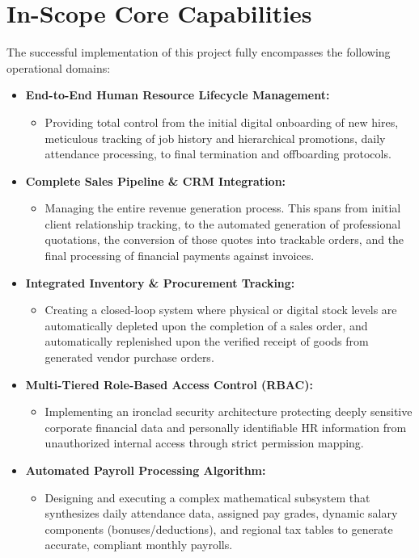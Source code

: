 ﻿\documentclass[12pt,a4paper]{report}
\begin{document}
\section*{In-Scope Core Capabilities}
The successful implementation of this project fully encompasses the following operational domains:
\begin{itemize}
    \item \textbf{End-to-End Human Resource Lifecycle Management:}
    \begin{itemize}
        \item Providing total control from the initial digital onboarding of new hires, meticulous tracking of job history and hierarchical promotions, daily attendance processing, to final termination and offboarding protocols.
    \end{itemize}
    \item \textbf{Complete Sales Pipeline \& CRM Integration:}
    \begin{itemize}
        \item Managing the entire revenue generation process. This spans from initial client relationship tracking, to the automated generation of professional quotations, the conversion of those quotes into trackable orders, and the final processing of financial payments against invoices.
    \end{itemize}
    \item \textbf{Integrated Inventory & Procurement Tracking:}
    \begin{itemize}
        \item Creating a closed-loop system where physical or digital stock levels are automatically depleted upon the completion of a sales order, and automatically replenished upon the verified receipt of goods from generated vendor purchase orders.
    \end{itemize}
    \item \textbf{Multi-Tiered Role-Based Access Control (RBAC):}
    \begin{itemize}
        \item Implementing an ironclad security architecture protecting deeply sensitive corporate financial data and personally identifiable HR information from unauthorized internal access through strict permission mapping.
    \end{itemize}
    \item \textbf{Automated Payroll Processing Algorithm:}
    \begin{itemize}
        \item Designing and executing a complex mathematical subsystem that synthesizes daily attendance data, assigned pay grades, dynamic salary components (bonuses/deductions), and regional tax tables to generate accurate, compliant monthly payrolls.
    \end{itemize}
\end{itemize}
\end{document}
